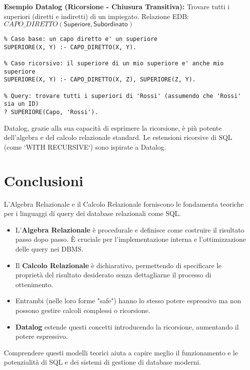 \documentclass{article}
\newcommand{\Rel}[1]{\textit{#1}} %
\newcommand{\Attr}[1]{\textsf{#1}} %
\begin{document}
	\textbf{Esempio Datalog (Ricorsione - Chiusura Transitiva):} Trovare tutti i superiori (diretti e indiretti) di un impiegato.
	Relazione EDB: $\Rel{CAPO\_DIRETTO}(\Attr{Superiore}, \Attr{Subordinato})$
	\begin{verbatim}
% Caso base: un capo diretto e' un superiore
SUPERIORE(X, Y) :- CAPO_DIRETTO(X, Y).
		
% Caso ricorsivo: il superiore di un mio superiore e' anche mio superiore
SUPERIORE(X, Y) :- CAPO_DIRETTO(X, Z), SUPERIORE(Z, Y).
		
% Query: trovare tutti i superiori di 'Rossi' (assumendo che 'Rossi' sia un ID)
? SUPERIORE(Capo, 'Rossi').
	\end{verbatim}
	Datalog, grazie alla sua capacità di esprimere la ricorsione, è più potente dell'algebra e del calcolo relazionale standard. Le estensioni ricorsive di SQL (come `WITH RECURSIVE`) sono ispirate a Datalog.
	
	\section{Conclusioni}
	L'Algebra Relazionale e il Calcolo Relazionale forniscono le fondamenta teoriche per i linguaggi di query dei database relazionali come SQL.
	\begin{itemize}
		\item L'\textbf{Algebra Relazionale} è procedurale e definisce come costruire il risultato passo dopo passo. È cruciale per l'implementazione interna e l'ottimizzazione delle query nei DBMS.
		\item Il \textbf{Calcolo Relazionale} è dichiarativo, permettendo di specificare le proprietà del risultato desiderato senza dettagliarne il processo di ottenimento.
		\item Entrambi (nelle loro forme "safe") hanno lo stesso potere espressivo ma non possono gestire calcoli complessi o ricorsione.
		\item \textbf{Datalog} estende questi concetti introducendo la ricorsione, aumentando il potere espressivo.
	\end{itemize}
	Comprendere questi modelli teorici aiuta a capire meglio il funzionamento e le potenzialità di SQL e dei sistemi di gestione di database moderni.
	
\end{document}
